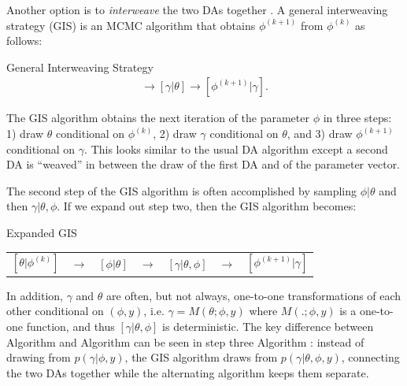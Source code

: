 \documentclass[12pt]{article}
\begin{document}
Another option is to {\it interweave} the two DAs together \citep{yu2011center}. A general interweaving strategy (GIS) is an MCMC algorithm that obtains $\phi^{(k+1)}$ from $\phi^{(k)}$ as follows:
\begin{alg*}[GIS]General Interweaving Strategy\label{alg:GIS}
  \begin{align*}
    [\theta|\phi^{(k)}] \to [\gamma|\theta] \to [\phi^{(k+1)}|\gamma].
  \end{align*}
\end{alg*}
\noindent The GIS algorithm obtains the next iteration of the parameter $\phi$ in three steps: 1) draw $\theta$ conditional on $\phi^{(k)}$, 2) draw $\gamma$ conditional on $\theta$, and 3) draw $\phi^{(k+1)}$ conditional on $\gamma$. This looks similar to the usual DA algorithm except a second DA is ``weaved'' in between the draw of the first DA and of the parameter vector. 

The second step of the GIS algorithm is often accomplished by sampling $\phi|\theta$ and then $\gamma|\theta,\phi$. If we expand out step two, then the GIS algorithm becomes:
\begin{alg*}[eGIS]Expanded GIS\label{alg:GIS2}
  \begin{center}
    \begin{tabular}{lllllll}
      $[\theta|\phi^{(k)}]$& $\to$& $[\phi|\theta]$& $\to $&$[\gamma|\theta,\phi]$& $\to$& $[\phi^{(k+1)}|\gamma]$
    \end{tabular}
  \end{center}
\end{alg*}
\noindent
In addition, $\gamma$ and $\theta$ are often, but not always, one-to-one transformations of each other conditional on $(\phi,y)$, i.e. $\gamma = M(\theta;\phi,y)$ where $M(.;\phi,y)$ is a one-to-one function, and thus $[\gamma|\theta,\phi]$ is deterministic.
The key difference between Algorithm  and Algorithm  can be seen in step three Algorithm : instead of drawing from $p(\gamma|\phi,y)$, the GIS algorithm draws from $p(\gamma|\theta,\phi,y)$, connecting the two DAs together while the alternating algorithm keeps them separate.
\end{document}
